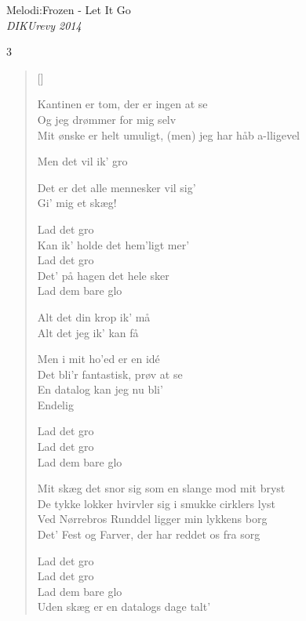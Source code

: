 {Melodi:Frozen - Let It Go}\\[.2em]
{\small\itshape DIKUrevy 2014}
\begin{multicols}3
\settowidth{\versewidth}{Kantinen er tom, der er ingen at se}
\begin{verse}[\versewidth]

Kantinen er tom, der er ingen at se\\
Og jeg drømmer for mig selv\\
Mit ønske er helt umuligt, (men) jeg har håb a-lligevel


Men det vil ik' gro

Det er det alle mennesker vil sig'\\
Gi' mig et skæg!

Lad det gro\\
Kan ik' holde det hem'ligt mer'\\
Lad det gro\\
Det' på hagen det hele sker\\
Lad dem bare glo

Alt det din krop ik' må\\
Alt det jeg ik' kan få

Men i mit ho'ed er en idé\\
Det bli'r fantastisk, prøv at se\\
En datalog kan jeg nu bli'\\
Endelig

Lad det gro\\
Lad det gro\\
Lad dem bare glo


Mit skæg det snor sig som en slange mod mit bryst\\
De tykke lokker hvirvler sig i smukke cirklers lyst\\
Ved Nørrebros Runddel ligger min lykkens borg\\
Det' Fest og Farver, der har reddet os fra sorg

Lad det gro\\
Lad det gro\\
Lad dem bare glo\\
Uden skæg er en datalogs dage talt'
\end{verse}
\end{multicols}
\newpage

